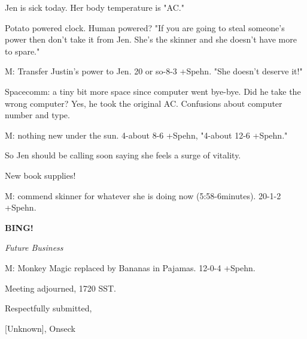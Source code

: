 \documentclass[12pt]{article}
\newcommand{\bing}{{\bf BING!} }
\newcommand{\goto}[1]{\bing \vskip 12pt \centerline{{\em{#1}}}}
\begin{document}
Jen is sick today. Her body temperature is "AC."

Potato powered clock. Human powered? "If you are going to steal someone's power then don't take it from Jen. She's the skinner and she doesn't have more to spare."

M: Transfer Justin's power to Jen. 20 or so-8-3 +Spehn. "She doesn't deserve it!"

Spacecomm: a tiny bit more space since computer went bye-bye. Did he take the wrong computer? Yes, he took the original AC. Confusions about computer number and type.

M: nothing new under the sun. 4-about 8-6 +Spehn, "4-about 12-6 +Spehn."

So Jen should be calling soon saying she feels a surge of vitality.

New book supplies!

M: commend skinner for whatever she is doing now (5:58-6minutes). 20-1-2 +Spehn.

\goto{Future Business}

M: Monkey Magic replaced by Bananas in Pajamas. 12-0-4 +Spehn.

\vspace{12pt}

\noindent
Meeting adjourned, 1720 SST.

\vspace{18pt}

\centerline{Respectfully submitted,}
\centerline{[Unknown], Onseck}
\end{document}
